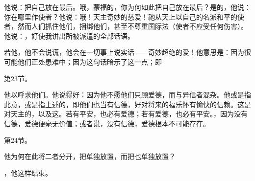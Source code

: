 他说：把自己放在最后。哦，蒙福的，你为何如此把自己放在最后？是的，他说：你在哪里作使者？他说：哦！天主奇妙的慈爱！祂从天上以自己的名派和平的使者，然而人们抓住他们，捆绑他们，甚至不尊重国际法（使者不应受任何伤害）。他说：，好使我讲出所被派遣的全部话语。\par

若他，他不会说谎，他会在一切事上说实话——奇妙超绝的爱！他意思是：因为很可能他们正处患难中；因为这句话暗示了这一点；即\par

第23节。\par

他以呼求他们。他说得好：因为他不愿他们只顾爱德，而与异信者混杂。他或是指此意，或是指上述的，即他们也当有信德，好对将来的福乐怀有愉快的信赖。这是对天主的，以及这。若有平安，也必有爱德；若有爱德，也必有平安。，因为没有信德，爱德便毫无价值；或者说，没有信德，爱德根本不可能存在。\par

第24节。\par

他为何在此将二者分开，把单独放置，而把也单独放置？\par

，他这样结束。\par

